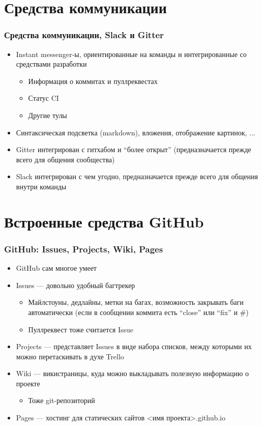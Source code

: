 \documentclass[xetex,mathserif,serif]{beamer}
\begin{document}
	\section{Средства коммуникации}

	\begin{frame}
		\frametitle{Средства коммуникации, Slack и Gitter}
		\begin{itemize}
			\item Instant messenger-ы, ориентированные на команды и интегрированные со средствами разработки
			\begin{itemize}
				\item Информация о коммитах и пуллреквестах
				\item Статус CI
				\item Другие тулы
			\end{itemize}
			\item Синтаксическая подсветка (markdown), вложения, отображение картинок, ...
			\item Gitter интегрирован с гитхабом и ``более открыт'' (предназначается прежде всего для общения сообщества)
			\item Slack интегрирован с чем угодно, предназначается прежде всего для общения внутри команды
		\end{itemize}
	\end{frame}

	\section{Встроенные средства GitHub}

	\begin{frame}
		\frametitle{GitHub: Issues, Projects, Wiki, Pages}
		\begin{itemize}
			\item GitHub сам многое умеет
			\item Issues --- довольно удобный багтрекер
			\begin{itemize}
				\item Майлстоуны, дедлайны, метки на багах, возможность закрывать баги автоматически (если в сообщении коммита есть ``close'' или ``fix'' и \#<номер бага>)
				\item Пуллреквест тоже считается Issue
			\end{itemize}
			\item Projects --- представляет Issues в виде набора списков, между которыми их можно перетаскивать в духе Trello
			\item Wiki --- викистраницы, куда можно выкладывать полезную информацию о проекте
			\begin{itemize}
				\item Тоже git-репозиторий
			\end{itemize}
			\item Pages --- хостинг для статических сайтов <имя проекта>.github.io
		\end{itemize}
	\end{frame}
\end{document}
